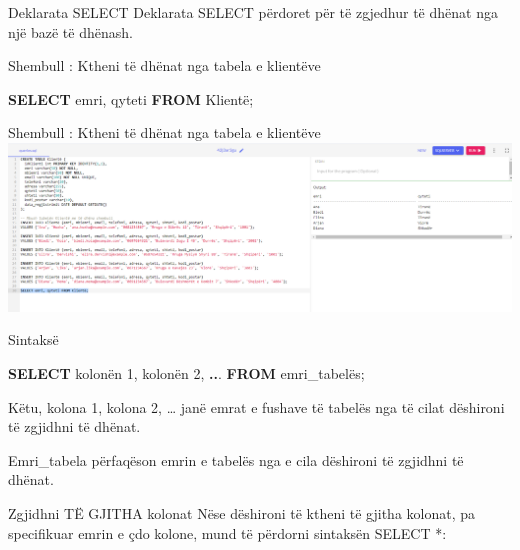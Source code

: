 \documentclass[
  ignorenonframetext,
]{beamer}
\newenvironment{Shaded}{\begin{snugshade}}{\end{snugshade}}
\newcommand{\DecValTok}[1]{\textcolor[rgb]{0.00,0.00,0.81}{#1}}
\newcommand{\KeywordTok}[1]{\textcolor[rgb]{0.13,0.29,0.53}{\textbf{#1}}}
\newcommand{\NormalTok}[1]{#1}
\newcommand{\OperatorTok}[1]{\textcolor[rgb]{0.81,0.36,0.00}{\textbf{#1}}}
\begin{document}
\begin{frame}{Deklarata SELECT}
\label{deklarata-select}
Deklarata SELECT përdoret për të zgjedhur të dhënat nga një bazë të
dhënash.
\end{frame}

\begin{frame}[fragile]{Shembull : Ktheni të dhënat nga tabela e
klientëve}
\label{shembull-ktheni-tuxeb-dhuxebnat-nga-tabela-e-klientuxebve}
\begin{Shaded}
\begin{Highlighting}[]
\KeywordTok{SELECT}\NormalTok{ emri, qyteti }\KeywordTok{FROM}\NormalTok{ Klientë;}
\end{Highlighting}
\end{Shaded}
\end{frame}

\begin{frame}{Shembull : Ktheni të dhënat nga tabela e klientëve}
\label{shembull-ktheni-tuxeb-dhuxebnat-nga-tabela-e-klientuxebve-1}
\includegraphics{./Figs/query2.png}
\end{frame}

\begin{frame}[fragile]{Sintaksë}
\label{sintaksuxeb}
\begin{Shaded}
\begin{Highlighting}[]
\KeywordTok{SELECT}\NormalTok{ kolonën }\DecValTok{1}\NormalTok{, kolonën }\DecValTok{2}\NormalTok{, }\OperatorTok{..}\NormalTok{.}
\KeywordTok{FROM}\NormalTok{ emri\_tabelës;}
\end{Highlighting}
\end{Shaded}

Këtu, kolona 1, kolona 2, \ldots{} janë emrat e fushave të tabelës nga
të cilat dëshironi të zgjidhni të dhënat.

Emri\_tabela përfaqëson emrin e tabelës nga e cila dëshironi të zgjidhni
të dhënat.
\end{frame}

\begin{frame}{Zgjidhni TË GJITHA kolonat}
\label{zgjidhni-tuxeb-gjitha-kolonat}
Nëse dëshironi të ktheni të gjitha kolonat, pa specifikuar emrin e çdo
kolone, mund të përdorni sintaksën SELECT *:
\end{frame}
\end{document}
